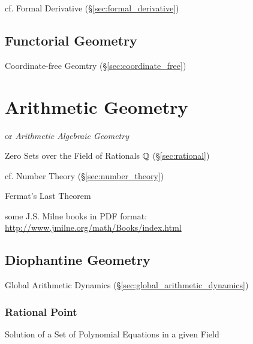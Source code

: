 cf. Formal Derivative (\S\ref{sec:formal_derivative})



\subsection{Functorial Geometry}\label{sec:functorial_geometry}

\fist Coordinate-free Geomtry (\S\ref{sec:coordinate_free})



\section{Arithmetic Geometry}\label{sec:arithmetic_geometry}

or \emph{Arithmetic Algebraic Geometry}

Zero Sets over the Field of Rationals $\mathbb{Q}$ (\S\ref{sec:rational})

cf. Number Theory (\S\ref{sec:number_theory})

Fermat's Last Theorem

some J.S. Milne books in PDF format:
\url{http://www.jmilne.org/math/Books/index.html}



\subsection{Diophantine Geometry}\label{sec:diophantine_geometry}

Global Arithmetic Dynamics (\S\ref{sec:global_arithmetic_dynamics})



\subsubsection{Rational Point}\label{sec:rational_point}

Solution of a Set of Polynomial Equations in a given Field



